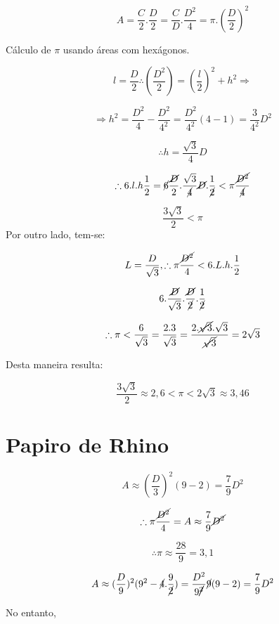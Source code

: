 \documentclass[a4paper, 12pt]{article}
\begin{document}
\[A = \frac{C}{2}.\frac{D}{2} = \frac{C}{D}.\frac{D^2}{4} = \pi.(\frac{D}{2})^2\]
\newline

Cálculo de $\pi$ usando áreas com hexágonos.



\[l = \frac{D}{2} \therefore (\frac{D^2}{2}) = (\frac{l}{2})^2 + h^2 \Rightarrow \]

\[\Rightarrow h^2 = \frac{D^2}{4} - \frac{D^2}{4^2} = \frac{D^2}{4^2} (4-1) = \frac{3}{4^2}D^2\]

\[\therefore h= \frac{\sqrt{3}}{4}D\]

\[\therefore 6.l.h\frac{1}{2} = \cancel{6} \frac{\cancel{D}}{2}.\frac{\sqrt{3}}{\cancel{4}}\cancel{D}.\frac{1}{\cancel{2}} <\pi\frac{\cancel{D^2}}{\cancel{4}}\]

\[\frac{3\sqrt{3}}{2} < \pi\]
\newline
Por outro lado, tem-se:

\[L= \frac{D}{\sqrt{3}}, \therefore \pi \frac{\cancel{D^2}}{4} < 6.L.h.\frac{1}{2}\]

\[6.\frac{\cancel{D}}{\sqrt{3}}.\frac{\cancel{D}}{\cancel{2}}.\frac{1}{\cancel{2}}\]

\[\therefore \pi < \frac{6}{\sqrt{3}} = \frac{2.3}{\sqrt{3}} = \frac{2.\cancel{\sqrt{3}}.\sqrt{3}}{\cancel{\sqrt{3}}} = 2\sqrt{3}\]

Desta maneira resulta:

\[\frac{3\sqrt{3}}{2} \approx 2,6 < \pi < 2\sqrt{3} \approx 3,46\]

\newpage

\section{Papiro de Rhino}

\[A \approx (\frac{D}{3})^2 (9-2) = \frac{7}{9}D^2\]

\[\therefore \pi \frac{\cancel{D^2}}{4} = A \approx \frac{7}{9} \cancel{D^2}\]

\[\therefore \pi \approx \frac{28}{9} = 3,1\]

\[A \approx (\frac{D}{9})^2(9^2 - \cancel{4}.\frac{9}{\cancel{2}}) = \frac{D^2}{9\cancel{^2}}\cancel{9}(9-2) = \frac{7}{9}D^2\]

No entanto, 
\end{document}
